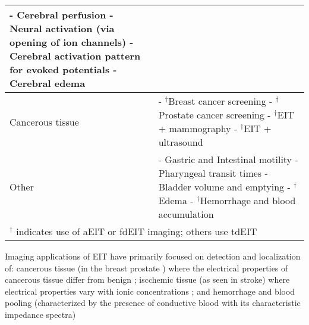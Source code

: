 \documentclass[12pt]{article} \usepackage[margin=3cm]{geometry} \usepackage[margin=20pt,font=small,labelfont=bf]{caption}\def\TBLWIDA{35mm}\def\TBLWIDB{95mm}
\begin{document}
\begin{table}
\begin{tabular}{p{\TBLWIDA}p{\TBLWIDB}}
 - Cerebral perfusion \cite{Adler2017Cerebral}
          \newline
 - Neural activation (via opening of ion channels) \cite{Aristovich2014Neural}
          \newline
 - Cerebral activation pattern for evoked potentials
          \newline
 - Cerebral edema
\\
    \hline
Cancerous tissue &
 - $^\dagger$Breast cancer screening \cite{Assenheimer2001TScan,Cherepenin2001Breast} 
      \newline
 - $^\dagger$Prostate cancer screening \cite{Borsic2009Prostate, Halter2007Postate}
      \newline
 - $^\dagger$EIT + mammography \cite{Choi2007Mammography}
      \newline
 - $^\dagger$EIT + ultrasound \cite{Soleimani2006Ultrasound}
\\
    \hline
Other &
 - Gastric and Intestinal motility \cite{Mangnall1987}
       \newline
 - Pharyngeal transit times \cite{Mangnall1987}
       \newline
 - Bladder volume and emptying \cite{Leonhardt2011Bladder}
       \newline
 - $^\dagger$Edema \cite{Newell1996,Abboud1995Peripheral}
       \newline
 - $^\dagger$Hemorrhage and blood accumulation \cite{Sadleir2009blood}
\\
\multicolumn{2}{l}{%
    $^\dagger$ indicates use of aEIT or fdEIT imaging;
    others use tdEIT
}
\end{tabular}
\end{table}

Imaging applications of EIT have primarily focused on detection
and localization of: cancerous tissue (in the breast
\cite{Assenheimer2001TScan,Cherepenin2001Breast} prostate
\cite{Borsic2009Prostate}) where the electrical properties of cancerous tissue
differ from benign \cite{Jossinet1998Breast}; iscchemic tissue (as seen in
stroke) where electrical properties vary with ionic concentrations
\cite{Holder1992Ischaemia}; and hemorrhage and blood pooling (characterized by
the presence of conductive blood with its characteristic impedance spectra)
\end{document}
